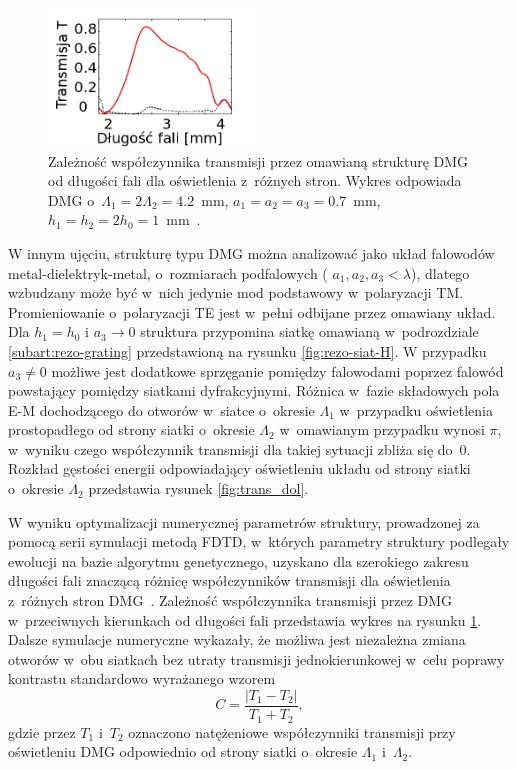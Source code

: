 \begin{figure}
	\centering
	\includegraphics[width=0.5\textwidth]{images/thz/opt_lett_spect.png}
	\caption{Zależność współczynnika transmisji przez omawianą strukturę DMG od długości fali dla oświetlenia z~różnych stron. Wykres odpowiada DMG o~$\Lambda_1= 2 \Lambda_2 = 4.2$~mm, $a_1=a_2=a_3=0.7$~mm, $h_1=h_2=2 h_0=1$~mm~\cite{Stolarek:13}.}
	\label{fig:trans_freq}
\end{figure}

 W innym ujęciu, strukturę typu DMG można analizować jako układ falowodów metal-dielektryk-metal, o~rozmiarach podfalowych ( $a_1,a_2,a_3 < \lambda$), dlatego wzbudzany może być w~nich jedynie mod podstawowy w~polaryzacji TM. Promieniowanie o~polaryzacji TE jest w~pełni odbijane przez omawiany układ. Dla $h_1=h_0$ i $a_3 \to 0$ struktura przypomina siatkę omawianą w~podrozdziale \ref{subart:rezo-grating} przedstawioną na rysunku \ref{fig:rezo-siat-H}. W przypadku $a_3 \ne 0$ możliwe jest dodatkowe sprzęganie pomiędzy falowodami poprzez falowód powstający pomiędzy siatkami dyfrakcyjnymi. Różnica w~fazie składowych pola E-M dochodzącego do otworów w~siatce o~okresie $\Lambda_1$ w~przypadku oświetlenia prostopadłego od strony siatki o~okresie $\Lambda_2$ w~omawianym przypadku wynosi $\pi$, w~wyniku czego współczynnik transmisji dla takiej sytuacji zbliża się do~0. Rozkład gęstości energii odpowiadający oświetleniu układu od strony siatki o~okresie $\Lambda_2$ przedstawia rysunek \ref{fig:trans_dol}.

W wyniku optymalizacji numerycznej parametrów struktury, prowadzonej za pomocą serii symulacji metodą FDTD, w~których parametry struktury podlegały ewolucji na bazie algorytmu genetycznego, uzyskano dla szerokiego zakresu długości fali znaczącą różnicę współczynników transmisji dla oświetlenia z~różnych stron DMG~\cite{Stolarek:13}. Zależność współczynnika transmisji przez DMG w~przeciwnych kierunkach od długości fali przedstawia wykres na rysunku \ref{fig:trans_freq}. Dalsze symulacje numeryczne wykazały, że możliwa jest niezależna zmiana otworów w~obu siatkach bez utraty transmisji jednokierunkowej w~celu poprawy kontrastu standardowo wyrażanego wzorem
\begin{equation}
C=\frac{|T_1 - T_2|}{T_1+T_2},
\label{eq:contrast}
\end{equation}
gdzie przez $T_1$ i~$T_2$ oznaczono natężeniowe współczynniki transmisji przy oświetleniu DMG odpowiednio od strony siatki o~okresie $\Lambda_1$ i~$\Lambda_2$.


